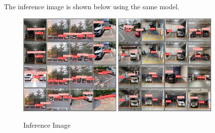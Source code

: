 \documentclass{article}
\begin{document}
\pagebreak

The inference image is shown below using the same model. 
\begin{figure}[ht]
    \centering
    \includegraphics[width=0.45\textwidth]{figs/inference1.png}
    \includegraphics[width=0.45\textwidth]{figs/inference2.png}
    \caption{Inference Image}
\end{figure}





\end{document}
